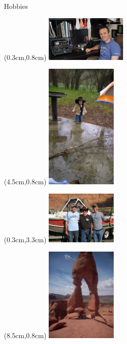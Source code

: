 \documentclass{beamer}
\begin{document}
\begin{frame}{Hobbies}
   \begin{textblock*}{\textwidth}(0.3cm,0.8cm) %
      \includegraphics[width=4.0cm]{../figures/radio.jpg}
   \end{textblock*}
   \begin{textblock*}{\textwidth}(4.5cm,0.8cm) %
      \includegraphics[width=3.5cm]{../figures/camping.jpg}
   \end{textblock*}
   \begin{textblock*}{\textwidth}(0.3cm,3.3cm) %
      \includegraphics[width=3.5cm]{../figures/fishing.jpg}
   \end{textblock*}
   \begin{textblock*}{\textwidth}(8.5cm,0.8cm) %
      \includegraphics[width=3.5cm]{../figures/hiking.jpg}
   \end{textblock*}

\end{frame}
\end{document}
